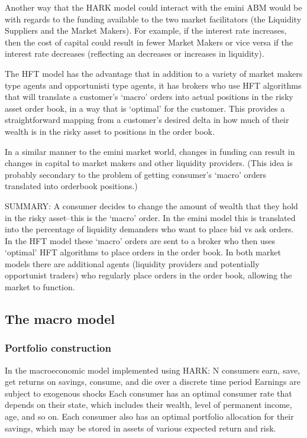 Another way that the HARK model could interact with the emini ABM would
be with regards to the funding available to the two market facilitators
(the Liquidity Suppliers and the Market Makers). For example, if the
interest rate increases, then the cost of capital could result in
fewer Market Makers or vice versa if the interest rate decreases
(reflecting an decreases or increases in liquidity).

The HFT model has the advantage that in addition to a variety of
market makers type agents and opportunisti type agents, it has brokers
who use HFT algorithms that will translate a customer’s ‘macro’ orders
into actual positions in the risky asset order book, in a way that is
‘optimal’ for the customer. This provides a straightforward mapping
from a customer’s desired delta in how much of their wealth is in
the risky asset to positions in the order book.

In a similar manner to the emini market world, changes in funding can
result in changes in capital to market makers and other liquidity
providers. (This idea is probably secondary to the problem of getting
consumer’s ‘macro’ orders translated into orderbook positions.)

SUMMARY: A consumer decides to change the amount of wealth that they
hold in the risky asset--this is the ‘macro’ order. In the emini model
this is translated into the percentage of liquidity demanders who want
to place bid vs ask orders. In the HFT model these ‘macro’ orders are
sent to a broker who then uses ‘optimal’ HFT algorithms to place
orders in the order book. In both market models there are additional
agents (liquidity providers and potentially opportunist traders)
who regularly place orders in the order book, allowing the market to function.

\subsection{The macro model}

\subsubsection{Portfolio construction}

In the macroeconomic model implemented using HARK:
N consumers earn, save, get returns on savings, consume, and die
over a discrete time period
Earnings are subject to exogenous shocks
Each consumer has an optimal consumer rate that depends on their state, which
includes their wealth, level of permanent income, age, and so on.
Each consumer also has an optimal portfolio allocation for their savings,
which may be stored in assets of various expected return and risk.

